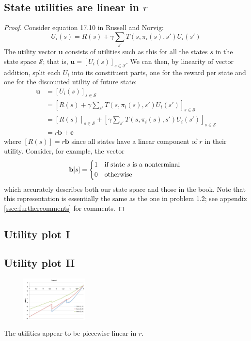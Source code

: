 \documentclass[letterpaper, 10pt]{article}
\begin{document}
\begin{multicols*}{2}
\subsection{State utilities are linear in $r$}
\begin{proof}
Consider equation 17.10 in Russell and Norvig:
\[ U_i(s) = R(s) + \gamma \sum_{s'} T(s, \pi_i(s), s') U_i(s') \]
The utility vector $\mathbf{u}$ consists of utilities such as this for all the states $s$ in the state space $\mathcal{S}$; that is, $\mathbf{u} = [U_i(s)]_{s \in \mathcal{S}}$.
We can then, by linearity of vector addition, split each $U_i$ into its constituent parts, one for the reward per state and one for the discounted utility of future state:
\begin{align*}
\mathbf{u} &= [U_i(s)]_{s \in \mathcal{S}} \\
&= \left[ R(s) + \gamma \sum_{s'} T(s, \pi_i(s), s') U_i(s') \right]_{s \in \mathcal{S}} \\
&= [R(s)]_{s \in \mathcal{S}} + \left[ \gamma \sum_{s'} T(s, \pi_i(s), s') U_i(s') \right]_{s \in \mathcal{S}} \\
&= r\mathbf{b} + \mathbf{c}
\end{align*}
where $[R(s)] = r\mathbf{b}$ since all states have a linear component of $r$ in their utility. 
Consider, for example, the vector
\[
\mathbf{b}[s] = \begin{dcases*}
1 & if state $s$ is a nonterminal \\
0 & otherwise
\end{dcases*}
\]
which accurately describes both our state space and those in the book. 
Note that this representation is essentially the same as the one in problem 1.2; see appendix \ref{ssec:furthercomments} for comments.
\end{proof}

\subsection{Utility plot I}


\subsection{Utility plot II}
\begin{figure}[h]
	\centering
	\includegraphics[width=0.3\textwidth]{prob15}
	\caption{}
	\label{fig:prob15}
\end{figure}
The utilities appear to be piecewise linear in $r$.


\end{multicols*}
\end{document}

